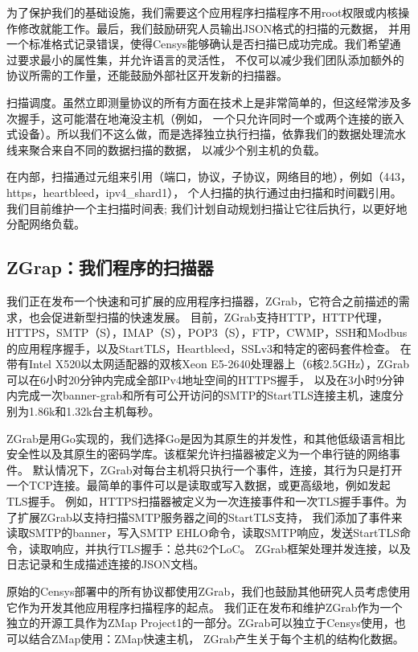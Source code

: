 为了保护我们的基础设施，我们需要这个应用程序扫描程序不用root权限或内核操作修改就能工作。最后，我们鼓励研究人员输出JSON格式的扫描的元数据，
并用一个标准格式记录错误，使得Censys能够确认是否扫描已成功完成。我们希望通过要求最小的属性集，并允许语言的灵活性，
不仅可以减少我们团队添加额外的协议所需的工作量，还能鼓励外部社区开发新的扫描器。

{\heiti 扫描调度。}虽然立即测量协议的所有方面在技术上是非常简单的，但这经常涉及多次握手，这可能潜在地淹没主机（例如，
一个只允许同时一个或两个连接的嵌入式设备）。所以我们不这么做，而是选择独立执行扫描，依靠我们的数据处理流水线来聚合来自不同的数据扫描的数据，
以减少个别主机的负载。

在内部，扫描通过元组来引用（端口，协议，子协议，网络目的地），例如（443，https，heartbleed，ipv4\_shard1），
个人扫描的执行通过由扫描和时间戳引用。我们目前维护一个主扫描时间表; 我们计划自动规划扫描让它往后执行，以更好地分配网络负载。

\subsection{ZGrap：我们程序的扫描器}

我们正在发布一个快速和可扩展的应用程序扫描器，ZGrab，它符合之前描述的需求，也会促进新型扫描的快速发展。 目前，ZGrab支持HTTP，HTTP代理，
HTTPS，SMTP（S），IMAP（S），POP3（S），FTP，CWMP，SSH和Modbus的应用程序握手，以及StartTLS，Heartbleed，SSLv3和特定的密码套件检查。 
在带有Intel X520以太网适配器的双核Xeon E5-2640处理器上（6核2.5GHz），ZGrab可以在6小时20分钟内完成全部IPv4地址空间的HTTPS握手，
以及在3小时9分钟内完成一次banner-grab和所有可公开访问的SMTP的StartTLS连接主机，速度分别为1.86k和1.32k台主机每秒。

ZGrab是用Go实现的，我们选择Go是因为其原生的并发性，和其他低级语言相比安全性以及其原生的密码学库。该框架允许扫描器被定义为一个串行链的网络事件。
默认情况下，ZGrab对每台主机将只执行一个事件，连接，其行为只是打开一个TCP连接。最简单的事件可以是读取或写入数据，或更高级地，例如发起TLS握手。
例如，HTTPS扫描器被定义为一次连接事件和一次TLS握手事件。为了扩展ZGrab以支持扫描SMTP服务器之间的StartTLS支持，
我们添加了事件来读取SMTP的banner，写入SMTP EHLO命令，读取SMTP响应，发送StartTLS命令，读取响应，并执行TLS握手：总共62个LoC。
ZGrab框架处理并发连接，以及日志记录和生成描述连接的JSON文档。

原始的Censys部署中的所有协议都使用ZGrab，我们也鼓励其他研究人员考虑使用它作为开发其他应用程序扫描程序的起点。
我们正在发布和维护ZGrab作为一个独立的开源工具作为ZMap Project1的一部分。ZGrab可以独立于Censys使用，也可以结合ZMap使用：ZMap快速主机，
ZGrab产生关于每个主机的结构化数据。


